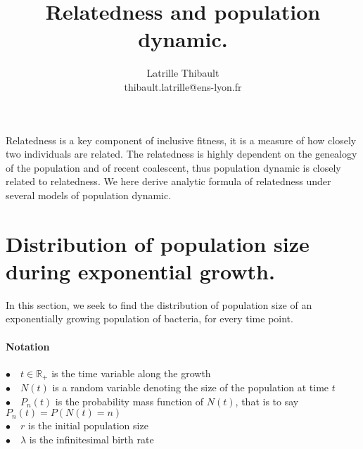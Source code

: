 \documentclass{article}
\author{Latrille Thibault\\
\small thibault.latrille@ens-lyon.fr\\[-0.8ex]}
\title{Relatedness and population dynamic.}
\begin{document}
\maketitle

Relatedness is a key component of inclusive fitness, it is a measure of how closely two individuals are related. The relatedness is highly dependent on the genealogy of the population and of recent coalescent, thus population dynamic is closely related to relatedness. We here derive analytic formula of relatedness under several models of population dynamic. 
\section{Distribution of population size during exponential growth.}

In this section, we seek to find the distribution of population size of an exponentially growing population of bacteria, for every time point.
 \paragraph{Notation} $ $\\
 $\bullet \quad t \in \mathbb{R}_+$ is the time variable along the growth\\
 $\bullet \quad N(t)$ is a random variable denoting the size of the population at time $t$\\
 $\bullet \quad P_n(t)$ is the probability mass function of $N(t)$, that is to say $P_n(t)=P(N(t)=n)$\\
 $\bullet \quad r$ is the initial population size\\
 $\bullet \quad \lambda$ is the infinitesimal birth rate\\
 
\end{document}
